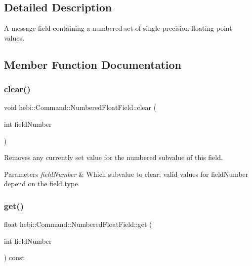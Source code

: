 \subsection{Detailed Description}
A message field containing a numbered set of single-\/precision floating point values. 

\subsection{Member Function Documentation}
\mbox{\label{classhebi_1_1Command_1_1NumberedFloatField_af70c3b41077806589227f0475b06f12f}} 
\subsubsection{\texorpdfstring{clear()}{clear()}}
{\footnotesize\ttfamily void hebi\+::\+Command\+::\+Numbered\+Float\+Field\+::clear (\begin{DoxyParamCaption}\item[{int}]{field\+Number }\end{DoxyParamCaption})}



Removes any currently set value for the numbered subvalue of this field. 


\begin{DoxyParams}{Parameters}
{\em field\+Number} & Which subvalue to clear; valid values for field\+Number depend on the field type. \\
\hline
\end{DoxyParams}
\mbox{\label{classhebi_1_1Command_1_1NumberedFloatField_acada541f53f008b7fa577c12029dd955}} 
\subsubsection{\texorpdfstring{get()}{get()}}
{\footnotesize\ttfamily float hebi\+::\+Command\+::\+Numbered\+Float\+Field\+::get (\begin{DoxyParamCaption}\item[{int}]{field\+Number }\end{DoxyParamCaption}) const}



